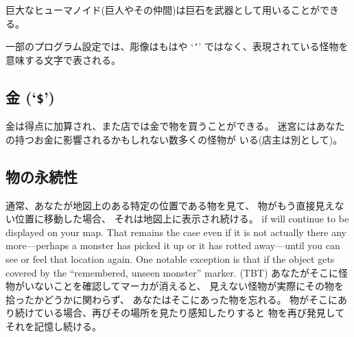 巨大なヒューマノイド(巨人やその仲間)は巨石を武器として用いることができる。

一部のプログラム設定では、彫像はもはや
`{\tt `}'
ではなく、表現されている怪物を意味する文字で表される。

\subsection*{金 (`{\tt \$}')}

金は得点に加算され、また店では金で物を買うことができる。
迷宮にはあなたの持つお金に影響されるかもしれない数多くの怪物が
いる(店主は別として)。

\subsection*{物の永続性}

通常、あなたが地図上のある特定の位置である物を見て、
物がもう直接見えない位置に移動した場合、
それは地図上に表示され続ける。
if will continue to be displayed on your map.
That remains the case even if it is not actually there any
more---perhaps a monster has picked it up or it has rotted
away---until you can see or feel that location again.
One notable exception is that if the object gets covered by the
``remembered, unseen monster'' marker.
(TBT)
あなたがそこに怪物がいないことを確認してマーカが消えると、
見えない怪物が実際にその物を拾ったかどうかに関わらず、
あなたはそこにあった物を忘れる。
物がそこにあり続けている場合、再びその場所を見たり感知したりすると
物を再び発見してそれを記憶し続ける。

